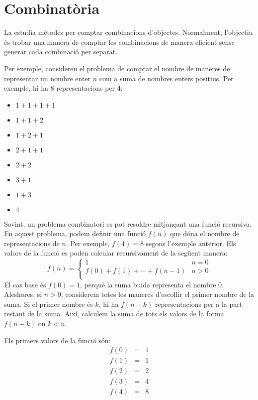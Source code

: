 \chapter{Combinatòria}


La  estudia mètodes per comptar combinacions
d'objectes. Normalment, l'objectiu és trobar una manera de comptar les
combinacions de manera eficient sense generar cada combinació per
separat.

Per exemple, considereu el problema de comptar el nombre de maneres de
representar un nombre enter $n$ com a suma de nombres enters
positius. Per exemple, hi ha 8 representacions per $4$:
\begin{multicols}{2}
\begin{itemize}
\item $1+1+1+1$
\item $1+1+2$
\item $1+2+1$
\item $2+1+1$
\item $2+2$
\item $3+1$
\item $1+3$
\item $4$
\end{itemize}
\end{multicols}


Sovint, un problema combinatori es pot resoldre mitjançant una funció
recursiva. En aquest problema, podem definir una funció $f(n)$ que
dóna el nombre de representacions de $n$. Per exemple, $f(4)=8$ segons
l'exemple anterior. Els valors de la funció es poden calcular
recursivament de la següent manera:
\begin{equation*}
    f(n) = \begin{cases}
               1               & n = 0\\
               f(0)+f(1)+\cdots+f(n-1) & n > 0\\
           \end{cases}
\end{equation*}
El cas base és $f(0)=1$, perquè la suma buida representa el nombre
0. Aleshores, si $n>0$, considerem totes les maneres d'escollir el
primer nombre de la suma. Si el primer nombre és $k$, hi ha $f(n-k)$
representacions per a la part restant de la suma. Així, calculem la
suma de tots els valors de la forma $f(n-k)$ on $k<n$.

Els primers valors de la funció són:
\[
\begin{array}{lcl}
f(0) & = & 1 \\
f(1) & = & 1 \\
f(2) & = & 2 \\
f(3) & = & 4 \\
f(4) & = & 8 \\
\end{array}
\]


